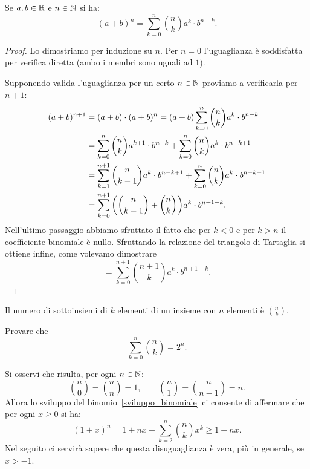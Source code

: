 \begin{theorem}
\label{th:sviluppo_binomiale}%
\mymark{***}%
Se $a,b\in \mathbb R$ e $n\in \mathbb N$ si ha:
\begin{equation}
\label{eq:sviluppo_binomiale}
(a+b)^n = \sum_{k=0}^n {n \choose k} a^k \cdot b^{n-k}.
\end{equation}
\end{theorem}
%
\begin{proof}
Lo dimostriamo per induzione su $n$.
Per $n=0$ l'uguaglianza è soddisfatta per verifica diretta (ambo i membri sono uguali ad $1$).

Supponendo valida l'uguaglianza per un certo $n\in \mathbb N$ proviamo a verificarla
per $n+1$:
\begin{align*}
(a+b)^{n+1}
&= (a+b)\cdot (a+b)^n
 = (a+b) \sum_{k=0}^n {n \choose k} a^k \cdot b^{n-k}\\
&= \sum_{k=0}^n {n \choose k} a^{k+1}\cdot b^{n-k}
   + \sum_{k=0}^n {n \choose k} a^k \cdot b^{n-k+1} \\
&= \sum_{k=1}^{n+1} {n \choose k-1} a^k \cdot b^{n-k+1}
   + \sum_{k=0}^n {n \choose k}a^k \cdot b^{n-k+1} \\
&= \sum_{k=0}^{n+1} {\left( {n \choose k-1} + {n \choose k} \right)} a^k \cdot b^{n+1-k}.
\end{align*}
Nell'ultimo passaggio abbiamo sfruttato il fatto che per $k<0$ e per $k>n$ il coefficiente binomiale è nullo.
Sfruttando la relazione del triangolo di Tartaglia si ottiene infine,
come volevamo dimostrare
\[
  = \sum_{k=0}^{n+1}{n+1 \choose k} a^k \cdot b^{n+1-k}.
\]
\end{proof}

\begin{exercise}
Il numero di sottoinsiemi di $k$ elementi di un insieme con $n$ elementi
è ${n\choose k}$.
\end{exercise}

\begin{exercise}
Provare che
\[
 \sum_{k=0}^n {n \choose k} = 2^n.
\]
\end{exercise}

Si osservi che risulta, per ogni $n\in \mathbb N$:
\[
  {n\choose 0} = {n \choose n} = 1,
  \qquad
  {n \choose 1} = {n \choose n-1} = n.
\]
Allora lo sviluppo del binomio~\eqref{sviluppo_binomiale}
ci consente di affermare
che per ogni $x\ge 0$ si ha:
\[
  (1+x)^n = 1 + nx + \sum_{k=2}^n {n\choose k} x^k
  \ge 1 + nx.
\]
Nel seguito ci servirà sapere che questa
disuguaglianza è vera, più in generale,
se $x > -1$.

